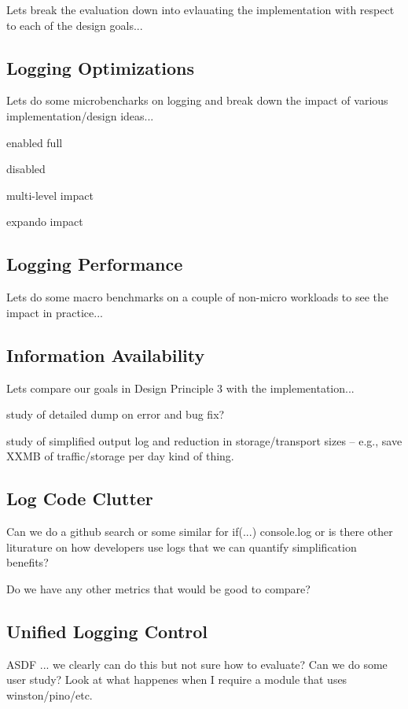 Lets break the evaluation down into evlauating the implementation with respect 
to each of the design goals...

\subsection{Logging Optimizations}
Lets do some microbencharks on logging and break down the impact of various 
implementation/design ideas...

enabled full

disabled

multi-level impact

expando impact

\subsection{Logging Performance}
Lets do some macro benchmarks on a couple of non-micro workloads to see the 
impact in practice...

\subsection{Information Availability}
Lets compare our goals in Design Principle 3 with the implementation... 

study of detailed dump on error and bug fix?

study of simplified output log and reduction in storage/transport sizes -- 
e.g., save XXMB of traffic/storage per day kind of thing.

\subsection{Log Code Clutter}
Can we do a github search or some similar for if(...) console.log or 
is there other liturature on how developers use logs that we can 
quantify simplification benefits?

Do we have any other metrics that would be good to compare?

\subsection{Unified Logging Control}
ASDF ... we clearly can do this but not sure how to evaluate? 
Can we do some user study? Look at what happenes when I require a 
module that uses winston/pino/etc.


